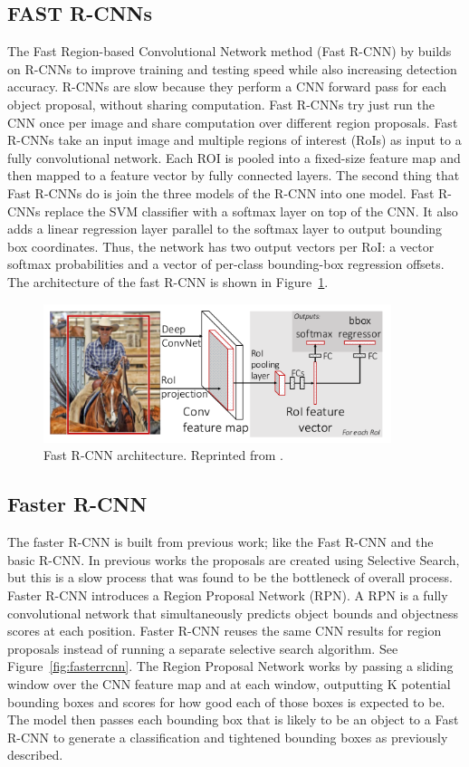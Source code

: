 \subsection{FAST R-CNNs}
The Fast Region-based Convolutional Network method (Fast R-CNN) by  builds on R-CNNs to improve training and testing speed while also increasing detection accuracy. R-CNNs are slow because they perform a CNN forward pass for each object proposal, without sharing computation. Fast R-CNNs try just run the CNN once per image and share computation over different region proposals. Fast R-CNNs take an input image and multiple regions of interest (RoIs) as input to a fully convolutional network. Each ROI is pooled into a fixed-size feature map and then mapped to a feature vector by fully connected layers. The second thing that Fast R-CNNs do is join the three models of the R-CNN into one model. Fast R-CNNs replace the SVM classifier with a softmax layer on top of the CNN. It also adds a linear regression layer parallel to the softmax layer to output bounding box coordinates. Thus, the network has two output vectors per RoI: a vector softmax probabilities and a vector of per-class bounding-box regression offsets. The architecture of the fast R-CNN is shown in Figure~\ref{fig:fastrcnn}. 

\begin{figure}[t]
  \centering
  \includegraphics[width=4in]{figures/fastrcnn.jpg}  
  \caption[FAST R-CNNs]{Fast R-CNN architecture. Reprinted from . }
  \label{fig:fastrcnn}
\end{figure}

\subsection{Faster R-CNN}
The faster R-CNN \cite{ren2015faster} is built from previous work; like the Fast R-CNN and the basic R-CNN. In previous works the proposals are created using Selective Search, but this is a slow process that was found to be the bottleneck of overall process. Faster R-CNN introduces a Region Proposal Network (RPN). A RPN is a fully convolutional network that simultaneously predicts object bounds and objectness scores at each position. Faster R-CNN reuses the same CNN results for region proposals instead of running a separate selective search algorithm. See Figure~\ref{fig:fasterrcnn}. The Region Proposal Network works by passing a sliding window over the CNN feature map and at each window, outputting K potential bounding boxes and scores for how good each of those boxes is expected to be. The model then passes each bounding box that is likely to be an object to a Fast R-CNN to generate a classification and tightened bounding boxes as previously described.

